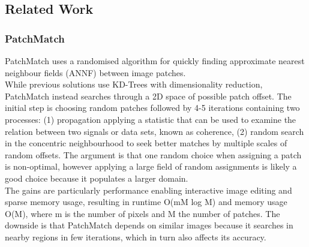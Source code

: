 





\subsection{Related Work}


\subsubsection{PatchMatch}
PatchMatch uses a randomised algorithm for quickly finding approximate nearest neighbour fields (ANNF) between image patches. 
\\[2mm]
While previous solutions use KD-Trees with dimensionality reduction, PatchMatch instead searches through a 2D space of possible patch offset. 
The initial step is choosing random patches followed by 4-5 iterations containing two processes: (1) propagation applying a statistic that can be used to examine the relation between two signals or data sets, known as coherence, (2) random search in the concentric neighbourhood to seek better matches by multiple scales of random offsets. The argument is that one random choice when assigning a patch is non-optimal, however applying a large field of random assignments is likely a good choice because it populates a larger domain. 
\\[2mm]
The gains are particularly performance enabling interactive image editing and sparse memory usage, resulting in runtime O(mM log M) and memory usage O(M), where m is the number of pixels and M the number of patches. The downside is that PatchMatch depends on similar images because it searches in nearby regions in few iterations, which in turn also affects its accuracy. 



